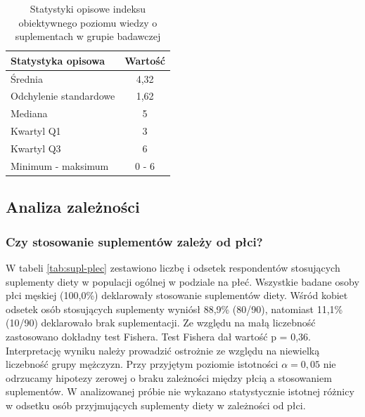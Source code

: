 \begin{table}[H]
    \centering
    \caption{Statystyki opisowe indeksu obiektywnego poziomu wiedzy o suplementach w grupie badawczej}
    \label{tab:stat-indeksu-wiedzy}
    \begin{tabular}{|l|c|}
        \hline
        \textbf{Statystyka opisowa} & \textbf{Wartość} \\
        \hline
        \hline
        Średnia & 4,32 \\
        \hline
        Odchylenie standardowe & 1,62 \\
        \hline
        Mediana & 5 \\
        \hline
        Kwartyl Q1 & 3 \\
        \hline
        Kwartyl Q3 & 6 \\
        \hline
        Minimum - maksimum & 0 - 6 \\
        \hline
    \end{tabular}
\end{table}


\subsection{Analiza zależności}

\subsubsection{Czy stosowanie suplementów zależy od płci?}

%
% 
% 
%

W tabeli \ref{tab:supl-plec} zestawiono liczbę i odsetek respondentów stosujących suplementy diety w populacji ogólnej w podziale na płeć. Wszystkie badane osoby płci męskiej (100,0\%) deklarowały stosowanie suplementów diety. Wśród kobiet odsetek osób stosujących suplementy wyniósł 88,9\% (80/90), natomiast 11,1\% (10/90) deklarowało brak suplementacji. Ze względu na małą liczebność zastosowano dokładny test Fishera. Test Fishera dał wartość p = 0,36. Interpretację wyniku należy prowadzić ostrożnie ze względu na niewielką liczebność grupy mężczyzn. Przy przyjętym poziomie istotności $\alpha = 0,05$ nie odrzucamy hipotezy zerowej o braku zależności między płcią a stosowaniem suplementów. W analizowanej próbie nie wykazano statystycznie istotnej różnicy w odsetku osób przyjmujących suplementy diety w zależności od płci.

